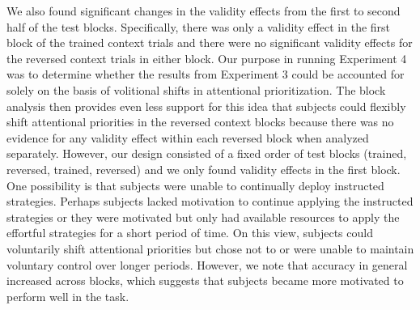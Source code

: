 \documentclass[]{DissertateCUNY}
\begin{document}
We also found significant changes in the validity effects from the first
to second half of the test blocks. Specifically, there was only a
validity effect in the first block of the trained context trials and
there were no significant validity effects for the reversed context
trials in either block. Our purpose in running Experiment 4 was to
determine whether the results from Experiment 3 could be accounted for
solely on the basis of volitional shifts in attentional prioritization.
The block analysis then provides even less support for this idea that
subjects could flexibly shift attentional priorities in the reversed
context blocks because there was no evidence for any validity effect
within each reversed block when analyzed separately. However, our design
consisted of a fixed order of test blocks (trained, reversed, trained,
reversed) and we only found validity effects in the first block. One
possibility is that subjects were unable to continually deploy
instructed strategies. Perhaps subjects lacked motivation to continue
applying the instructed strategies or they were motivated but only had
available resources to apply the effortful strategies for a short period
of time. On this view, subjects could voluntarily shift attentional
priorities but chose not to or were unable to maintain voluntary control
over longer periods. However, we note that accuracy in general increased
across blocks, which suggests that subjects became more motivated to
perform well in the task.
\end{document}
